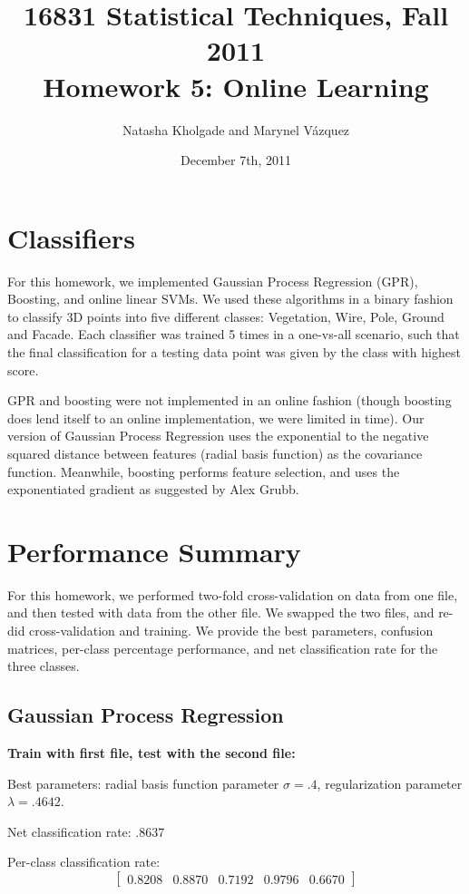 \documentclass[letterpaper]{article}
\title{16831 Statistical Techniques, Fall 2011\\Homework 5: Online Learning}
\date{December 7th, 2011}
\author{Natasha Kholgade and Marynel V\'azquez}
\begin{document}
\maketitle

\section*{Classifiers}

For this homework, we implemented Gaussian Process Regression (GPR),
Boosting, and online linear SVMs. We used these algorithms in a binary
fashion to classify 3D points into five different classes: Vegetation,
Wire, Pole, Ground and Facade. Each classifier was trained 5 times in
a one-vs-all scenario, such that the final classification for a
testing data point was given by the class with highest score.

GPR and boosting were not implemented in an online fashion (though
boosting does lend itself to an online implementation, we were limited
in time). Our version of Gaussian Process Regression uses the
exponential to the negative squared distance between features (radial
basis function) as the covariance function. Meanwhile, boosting
performs feature selection, and uses the exponentiated gradient as
suggested by Alex Grubb.

\section*{Performance Summary}

For this homework, we performed two-fold cross-validation on data from one file, and then tested with data from the other file. We swapped the two files, and re-did cross-validation and training. We provide the best parameters, confusion matrices, per-class percentage performance, and net classification rate for the three classes. 

\subsection*{Gaussian Process Regression}

\textbf{Train with first file, test with the second file:}

Best parameters: radial basis function parameter $\sigma=.4$, regularization parameter $\lambda=.4642$.

Net classification rate: .8637

Per-class classification rate: 
$$\begin{bmatrix}0.8208   & 0.8870  &  0.7192   & 0.9796 &   0.6670\end{bmatrix}$$
\end{document}
